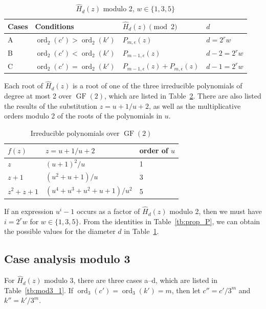 \documentclass[ALCO,ThmDefs,Unicode,epreuves]{cedram}
\DeclareMathOperator{\ord}{ord}
\DeclareMathOperator{\GF}{GF}
\begin{document}
\begin{table}[htb]\centering
 \caption{$\hat{H}_d(z)$ modulo 2, $w \in \{ 1,3,5\}$} \label{tb:mod2_1}
\renewcommand{\arraystretch}{1.3}
\begin{tabular}{|l|l|l|l|} \hline
Cases & Conditions& $\hat{H}_{d}(z) \pmod{2}$ & $d$ \\ \hline
A& $\ord_2(c')>\ord_2(k')$ & $P_{m,\epsilon}(z)$ &
$d=2^r w$ \\
B& $\ord_2(c')<\ord_2(k')$ & $P_{m-1,\epsilon}(z)$ &
$d-2=2^r w$ \\
C& $\ord_2(c')=\ord_2(k')$ & $P_{m-1,\epsilon}(z)+P_{m,\epsilon}(z)$ &
$d-1=2^r w$ \\
\hline
\end{tabular}
\end{table} 

Each root of $\hat{H}_d(z)$ is a root of one of the three irreducible polynomials of degree at most 2 over $\GF (2)$, which are listed in Table~\ref{tb:mod2_2}. There are also 
listed the results of the substitution $z=u+1/u+2$, as well as the multiplicative orders modulo 2 of the roots of the polynomials in $u$.

\begin{table}[htb]\centering
\caption{Irreducible polynomials over $\GF (2)$} \label{tb:mod2_2}
\renewcommand{\arraystretch}{1.3}
\begin{tabular}{|l|l|l|}
\hline 
$f(z)$ & $z=u+1/u+2$ & order of $u$ \\ \hline
$z$ & $(u+1)^2/u$ & 1\\
$z+1$ & $(u^2+u+1)/u$ & 3 \\
$z^2+z+1$ & $(u^4+u^3+u^2+u+1)/u^2$ & 5 \\ \hline
\end{tabular}
\end{table} 

If an expression $u^i-1$ occurs as a factor of $\hat{H}_d(z)$ modulo 2, then we must have $i=2^r w$ for $w\in \{1,3,5 \}$. 
From the identities in Table~\ref{tb:prop_P}, we can obtain 
the possible values for the diameter $d$ in Table~\ref{tb:mod2_1}. 

\subsection{Case analysis modulo 3}
 For $\hat{H}_d(z)$ modulo 3, there are three cases a--d, which are listed in Table~\ref{tb:mod3_1}. If $\ord_3(c')=\ord_3(k')=m$, then let $c''=c'/3^m$ and $k''=k'/3^m$. 
\end{document}
